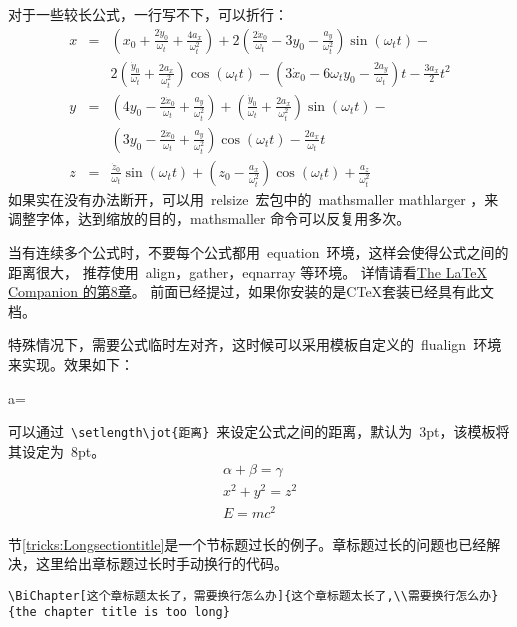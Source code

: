 对于一些较长公式，一行写不下，可以折行：
{\setlength\arraycolsep{2pt}
\begin{eqnarray}
x & = & \left( x_{0}+\frac{2\dot{y}_{0}}{\omega_{t}}+\frac{4a_{x}}{\omega_{t}^{2}}\right) +2\left( \frac{2\dot{x}_{0}}{\omega_{t}}-3y_{0}-\frac{a_{y}}{\omega_{t}^{2}}\right) \sin (\omega_{t} t)- \nonumber\\
& & 2\left( \frac{\dot{y}_{0}}{\omega_{t}}+\frac{2a_{x}}{\omega_{t}^{2}}\right) \cos (\omega_{t} t)-\left( 3\dot{x}_{0}-6\omega_{t} y_{0}-\frac{2a_{y}}{\omega_{t}}\right) t-\frac{3a_{x}}{2}t^{2} \\
y & = & \left( 4y_{0}-\frac{2\dot{x}_{0}}{\omega_{t}}+\frac{a_{y}}{\omega_{t}^{2}} \right) +\left( \frac{\dot{y}_{0}}{\omega_{t}}+\frac{2a_{x}}{\omega_{t}^{2}}\right) \sin (\omega_{t} t) -\nonumber\\
& & \left( 3y_{0}-\frac{2\dot{x}_{0}}{\omega_{t}}+\frac{a_{y}}{\omega_{t}^{2}}\right) \cos (\omega_{t}t)-\frac{2a_{x}}{\omega_{t}}t \\
z & = & \frac{\dot{z}_{0}}{\omega_{t}}\sin (\omega_{t}t)+\left( z_{0}-\frac{a_{x}}{\omega_{t}^{2}}\right)\cos (\omega_{t}t)+\frac{a_{z}}{\omega_{t}^{2}}
\end{eqnarray}}
如果实在没有办法断开，可以用~relsize~宏包中的~mathsmaller mathlarger ，来调整字体，达到缩放的目的，mathsmaller 命令可以反复用多次。

当有连续多个公式时，不要每个公式都用~equation~环境，这样会使得公式之间的距离很大，
推荐使用~align，gather，eqnarray 等环境。
详情请看\href{ftp://ftp.ctex.org/pub/tex/documents/bible/LaTeX_Companion_ch8.zip}{The LaTeX Companion 的第8章}。
前面已经提过，如果你安装的是CTeX套装已经具有此文档。

特殊情况下，需要公式临时左对齐，这时候可以采用模板自定义的~flualign~环境来实现。效果如下：
\begin{flualign}
a=\delta
\end{flualign}

可以通过~\verb"\setlength\jot{距离}"~来设定公式之间的距离，默认为~3pt，该模板将其设定为~8pt。
\begin{gather}
\alpha + \beta = \gamma\\
x^2+y^2=z^2\\
E=mc^2
\end{gather}

\label{tricks:Longsectiontitle}

节\ref{tricks:Longsectiontitle}是一个节标题过长的例子。章标题过长的问题也已经解决，这里给出章标题过长时手动换行的代码。
\begin{verbatim}\BiChapter[这个章标题太长了，需要换行怎么办]{这个章标题太长了,\\需要换行怎么办}
{the chapter title is too long}\end{verbatim}

